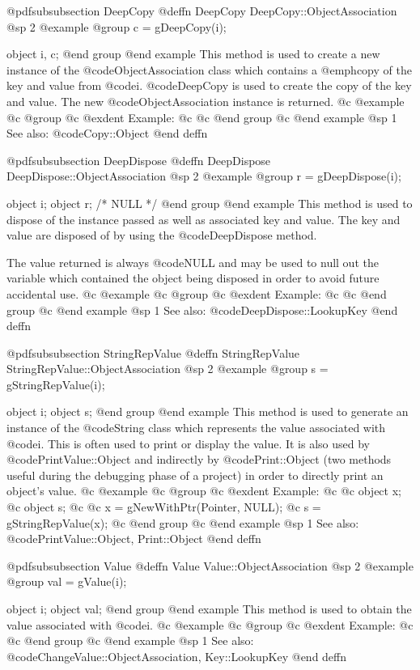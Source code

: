 @pdfsubsubsection {DeepCopy}
@deffn {DeepCopy} DeepCopy::ObjectAssociation
@sp 2
@example
@group
c = gDeepCopy(i);

object  i, c;
@end group
@end example
This method is used to create a new instance of the
@code{ObjectAssociation} class which contains a @emph{copy} of the key
and value from @code{i}.  @code{DeepCopy}
is used to create the copy of the key and value.  The new
@code{ObjectAssociation} instance is returned.
@c @example
@c @group
@c @exdent Example:
@c 
@c @end group
@c @end example
@sp 1
See also:  @code{Copy::Object}
@end deffn











@pdfsubsubsection {DeepDispose}
@deffn {DeepDispose} DeepDispose::ObjectAssociation
@sp 2
@example
@group
r = gDeepDispose(i);

object  i;
object  r;     /*  NULL  */
@end group
@end example
This method is used to dispose of the instance passed as well as
associated key and value.  The key and value are disposed of by using
the @code{DeepDispose} method.  

The value returned is always @code{NULL} and may be used to null out
the variable which contained the object being disposed in order to
avoid future accidental use.
@c @example
@c @group
@c @exdent Example:
@c 
@c @end group
@c @end example
@sp 1
See also:  @code{DeepDispose::LookupKey}
@end deffn








@pdfsubsubsection {StringRepValue}
@deffn {StringRepValue} StringRepValue::ObjectAssociation
@sp 2
@example
@group
s = gStringRepValue(i);

object  i;
object  s;
@end group
@end example
This method is used to generate an instance of the @code{String} class
which represents the value associated with @code{i}.  This is often
used to print or display the value.  It is also used by
@code{PrintValue::Object} and indirectly by @code{Print::Object}
(two methods useful during the debugging phase of a project)
in order to directly print an object's value.
@c @example
@c @group
@c @exdent Example:
@c 
@c object  x;
@c object  s;
@c 
@c x = gNewWithPtr(Pointer, NULL);
@c s = gStringRepValue(x);
@c @end group
@c @end example
@sp 1
See also:  @code{PrintValue::Object, Print::Object}
@end deffn










@pdfsubsubsection {Value}
@deffn {Value} Value::ObjectAssociation
@sp 2
@example
@group
val = gValue(i);

object  i;
object  val;
@end group
@end example
This method is used to obtain the value associated with
@code{i}.
@c @example
@c @group
@c @exdent Example:
@c 
@c @end group
@c @end example
@sp 1
See also:  @code{ChangeValue::ObjectAssociation, Key::LookupKey}
@end deffn




